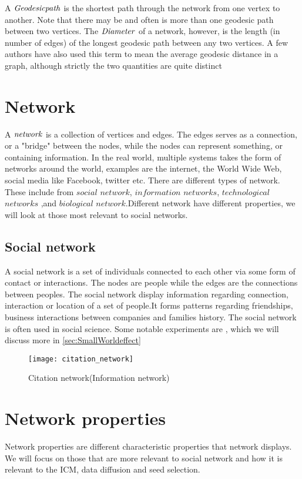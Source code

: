 A $\it{{Geodesic path}}$ is the shortest path through the network from one vertex to another. Note that there may be and often is more than one geodesic path between two vertices. The $\it{{Diameter}}$ of a network, however,  is the length (in number of edges) of the longest geodesic path between any two vertices. A few authors have also used this term to mean the average geodesic distance in a graph, although strictly the two quantities are quite distinct

\section{Network}
A $\it{network}$ is a collection of vertices and edges\cite{ComplexNetwork2003}. The edges serves as a connection, or a "bridge" between the nodes, while the nodes can represent something, or containing information. In the real world, multiple systems takes the form of networks around the world, examples are the internet, the World Wide Web, social media like Facebook, twitter etc.  There are different types of network. These include from $social$ $network$, ${information}$ ${networks}$, $technological$ $networks$ ,and $biological$ $network$.Different network have different properties, we will look at those most relevant to social networks.

\subsection{Social network}
A social network is a set of individuals connected to each other via some form of contact or interactions\cite{ComplexNetwork2003}. The nodes are people while the edges are the connections between peoples. The social network display information regarding connection, interaction or location of a set of people.It forms patterns regarding friendships, business interactions between companies and families history. The social network is often used in social science\cite{ComplexNetwork2003}. Some notable experiments are \cite{smallWorldExperiment}, which we will discuss more in \ref{sec:SmallWorldeffect} 

\begin{figure}[!ht]
\centering
	\texttt{[image: citation\_network]}
	\caption{Citation network(Information network)} 
	\label{fig:CitationN}
\end{figure}

\section{Network properties}
Network properties are different characteristic properties that network displays. We will focus on those that are more relevant to social network and how it is relevant to the ICM, data diffusion and seed selection.

